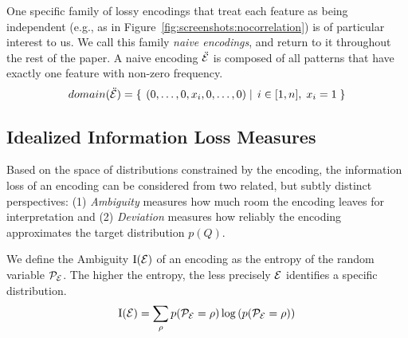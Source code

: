 
One specific family of lossy encodings that treat each feature as being independent (e.g., as in Figure~\ref{fig:screenshots:nocorrelation}) is of particular interest to us.  
We call this family \emph{naive encodings}, and return to it throughout the rest of the paper.
A naive encoding $\ddot{\mathcal E}$ is composed of all patterns that have exactly one feature with non-zero frequency.
$$domain(\ddot{\mathcal E})=\left\{\left.\;{(0, \ldots, 0, x_i, 0, \ldots, 0)}\;\right|\;{i \in [1,n],\; x_i = 1}\;\right\}$$




\subsection{Idealized Information Loss Measures}
\label{sec:idealizedrepresentativenessmeasures}
Based on the space of distributions constrained by the encoding, the information loss of an encoding can be considered from two related, but subtly distinct perspectives:
(1) \emph{Ambiguity} measures how much room the encoding leaves for interpretation and 
(2) \emph{Deviation} measures how reliably the encoding approximates the target distribution $p(Q)$.

\smallskip
{}
We define the Ambiguity $\text{I}(\mathcal E)$ of an encoding as the entropy of the random variable $\mathcal P_\mathcal E$. 
The higher the entropy, the less precisely $\mathcal E$ identifies a specific distribution.%
$$\text{I}(\mathcal E) = \operatorname*{\sum}\limits_{\rho}p(\mathcal P_\mathcal E = \rho)\log \left(p(\mathcal P_\mathcal E=\rho)\right)$$

